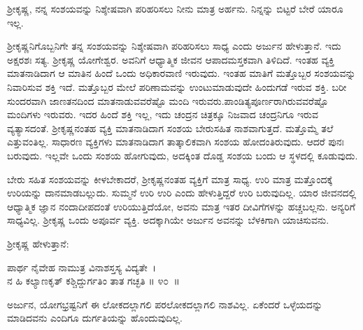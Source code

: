 \begin{artha}
ಶ‍್ರೀಕೃಷ್ಣ, ನನ್ನ ಸಂಶಯವನ್ನು ನಿಶ್ಶೇಷವಾಗಿ ಪರಿಹರಿಸಲು ನೀನು ಮಾತ್ರ ಅರ್ಹನು. ನಿನ್ನನ್ನು ಬಿಟ್ಟರೆ ಬೇರೆ ಯಾರೂ ಇಲ್ಲ.
\end{artha}

\newpage

ಶ‍್ರೀಕೃಷ್ಣನಿಗೊಬ್ಬನಿಗೇ ತನ್ನ ಸಂಶಯವನ್ನು ನಿಶ್ಶೇಷವಾಗಿ ಪರಿಹರಿಸಲು ಸಾಧ್ಯ ಎಂದು ಅರ್ಜುನ ಹೇಳುತ್ತಾನೆ. ಇದು ಅಕ್ಷರಶಃ ಸತ್ಯ. ಶ‍್ರೀಕೃಷ್ಣ ಯೋಗೇಶ್ವರ. ಅವನಿಗೆ ಆಧ್ಯಾತ್ಮಿಕ ಜೀವನ ಆಪಾದಮಸ್ತಕವಾಗಿ ತಿಳಿದಿದೆ. ಇಂತಹ ವ್ಯಕ್ತಿ ಮಾತನಾಡಿದಾಗ ಆ ಮಾತಿನ ಹಿಂದೆ ಒಂದು ಅಧಿಕಾರವಾಣಿ ಇರುವುದು. ಇಂತಹ ಮಾತಿಗೆ ಮತ್ತೊಬ್ಬರ ಸಂಶಯವನ್ನು ನಿವಾರಿಸುವ ಶಕ್ತಿ ಇದೆ. ಮತ್ತೊಬ್ಬರ ಮೇಲೆ ಪರಿಣಾಮವನ್ನು ಉಂಟುಮಾಡುವುದೇ ಹಿಂದುಗಡೆ ಇರುವ ಶಕ್ತಿ. ಬರೀ ಸುಂದರವಾಗಿ ಜಾಣತನದಿಂದ ಮಾತನಾಡುವವರೆಷ್ಟೊ ಮಂದಿ ಇರುವರು.\break ಪಾಂಡಿತ್ಯಪೂರ್ಣರಾಗಿರುವವರೆಷ್ಟೊ ಮಂದಿಗಳು ಇರುವರು. ಇದರ ಹಿಂದೆ ಶಕ್ತಿ ಇಲ್ಲ, ಇದು ಚಂದ್ರನ ಚಿತ್ರಕ್ಕೂ ನಿಜವಾದ ಚಂದ್ರನಿಗೂ ಇರುವ ವ್ಯತ್ಯಾಸದಂತೆ. ಶ‍್ರೀಕೃಷ್ಣನಂತಹ ವ್ಯಕ್ತಿ ಮಾತನಾಡಿದಾಗ ಸಂಶಯ ಬೇರುಸಹಿತ ನಾಶವಾಗುತ್ತದೆ. ಮತ್ತೊಮ್ಮೆ ತಲೆ ಎತ್ತುವಂತಿಲ್ಲ. ಸಾಧಾರಣ ವ್ಯಕ್ತಿಗಳು ಮಾತನಾಡಿದಾಗ ತಾತ್ಕಾಲಿಕವಾಗಿ ಸಂಶಯ ಹೋದಂತಿರುವುದು. ಆದರೆ ಪುನಃ ಬರುವುದು. ಇಲ್ಲವೇ ಒಂದು ಸಂಶಯ ಹೋಗುವುದು, ಅದಕ್ಕಿಂತ ದೊಡ್ಡ ಸಂಶಯ ಬಂದು ಆ ಸ್ಥಳದಲ್ಲಿ ಕೂಡುವುದು.

ಬೇರು ಸಹಿತ ಸಂಶಯವನ್ನು ಕೀಳಬೇಕಾದರೆ, ಶ‍್ರೀಕೃಷ್ಣನಂತಹ ವ್ಯಕ್ತಿಗೆ ಮಾತ್ರ ಸಾಧ್ಯ. ಉರಿ ಮಾತ್ರ ಮತ್ತೊಂದಕ್ಕೆ ಉರಿಯನ್ನು ದಾನಮಾಡಬಲ್ಲುದು. ಸುಮ್ಮನೆ ಉರಿ ಉರಿ ಎಂದು ಹೇಳುತ್ತಿದ್ದರೆ ಉರಿ ಬರುವುದಿಲ್ಲ. ಯಾರ ಜೀವನದಲ್ಲಿ ಆಧ್ಯಾತ್ಮಿಕ ಜ್ಞಾನ ನಂದಾದೀಪದಂತೆ ಉರಿಯುತ್ತಿದೆಯೋ, ಅವನು ಮಾತ್ರ ಇತರ ದೀವಿಗೆಗಳನ್ನು ಹಚ್ಚಬಲ್ಲನು. ಅನ್ಯರಿಗೆ ಸಾಧ್ಯವಿಲ್ಲ. ಶ‍್ರೀಕೃಷ್ಣ ಒಂದು ಅಪೂರ್ವ ವ್ಯಕ್ತಿ. ಅದಕ್ಕಾಗಿಯೇ ಅರ್ಜುನ ಅವನನ್ನು ಬೆಳಕಿಗಾಗಿ ಯಾಚಿಸುವನು.

ಶ‍್ರೀಕೃಷ್ಣ ಹೇಳುತ್ತಾನೆ:

\begin{shloka}
ಪಾರ್ಥ ನೈವೇಹ ನಾಮುತ್ರ ವಿನಾಶಸ್ತಸ್ಯ ವಿದ್ಯತೇ~।\\ನ ಹಿ ಕಲ್ಯಾಣಕೃತ್ ಕಶ್ಚಿದ್ದುರ್ಗತಿಂ ತಾತ ಗಚ್ಛತಿ \hfill॥ ೪೦~॥
\end{shloka}

\begin{artha}
ಅರ್ಜುನ, ಯೋಗಭ್ರಷ್ಟನಿಗೆ ಈ ಲೋಕದಲ್ಲಾಗಲಿ ಪರಲೋಕದಲ್ಲಾಗಲಿ ನಾಶವಿಲ್ಲ. ಏಕೆಂದರೆ ಒಳ್ಳೆಯದನ್ನು ಮಾಡಿದವನು ಎಂದಿಗೂ ದುರ್ಗತಿಯನ್ನು ಹೊಂದುವುದಿಲ್ಲ.
\end{artha}

